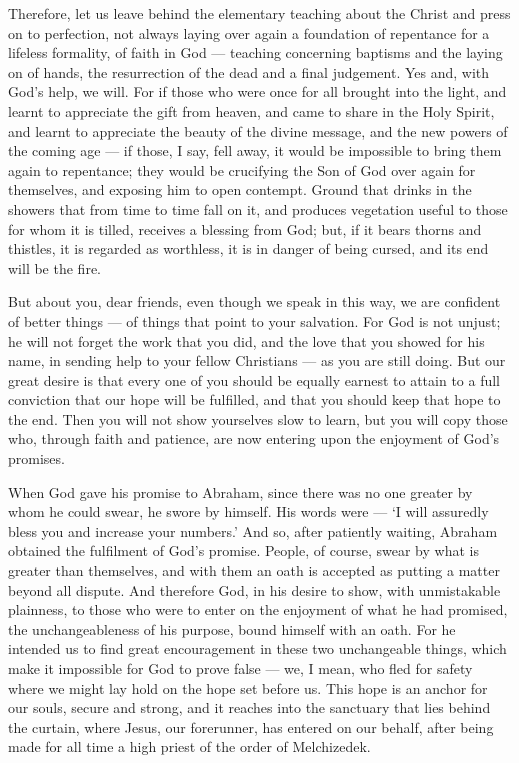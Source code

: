  Therefore, let us leave behind the elementary teaching
about the Christ and press on to perfection, not always laying over
again a foundation of repentance for a lifeless formality, of faith in
God ---  teaching concerning baptisms and the laying on of
hands, the resurrection of the dead and a final judgement. 
Yes and, with God's help, we will.  For if those who were
once for all brought into the light, and learnt to appreciate the gift
from heaven, and came to share in the Holy Spirit,  and
learnt to appreciate the beauty of the divine message, and the new
powers of the coming age ---  if those, I say, fell away, it
would be impossible to bring them again to repentance; they would be
crucifying the Son of God over again for themselves, and exposing him to
open contempt.  Ground that drinks in the showers that from
time to time fall on it, and produces vegetation useful to those for
whom it is tilled, receives a blessing from God;  but, if it
bears thorns and thistles, it is regarded as worthless, it is in danger
of being cursed, and its end will be the fire.

 But about you, dear friends, even though we speak in this
way, we are confident of better things --- of things that point to your
salvation.  For God is not unjust; he will not forget the
work that you did, and the love that you showed for his name, in sending
help to your fellow Christians --- as you are still doing. 
But our great desire is that every one of you should be equally earnest
to attain to a full conviction that our hope will be fulfilled, and that
you should keep that hope to the end.  Then you will not
show yourselves slow to learn, but you will copy those who, through
faith and patience, are now entering upon the enjoyment of God's
promises.

 When God gave his promise to Abraham, since there was no
one greater by whom he could swear, he swore by himself. 
His words were --- `I will assuredly bless you and increase your
numbers.'  And so, after patiently waiting, Abraham
obtained the fulfilment of God's promise.  People, of
course, swear by what is greater than themselves, and with them an oath
is accepted as putting a matter beyond all dispute.  And
therefore God, in his desire to show, with unmistakable plainness, to
those who were to enter on the enjoyment of what he had promised, the
unchangeableness of his purpose, bound himself with an oath.
 For he intended us to find great encouragement in these
two unchangeable things, which make it impossible for God to prove false
--- we, I mean, who fled for safety where we might lay hold on the hope
set before us.  This hope is an anchor for our souls,
secure and strong, and it reaches into the sanctuary that lies behind
the curtain,  where Jesus, our forerunner, has entered on
our behalf, after being made for all time a high priest of the order of
Melchizedek.

